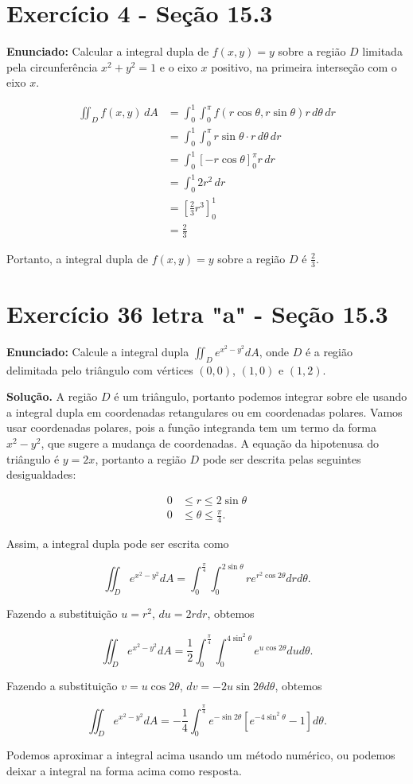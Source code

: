 \documentclass{article}
\begin{document}
\section*{Exercício 4 - Seção 15.3}

\textbf{Enunciado:} Calcular a integral dupla de $f(x,y) = y$ sobre a região $D$ limitada pela circunferência $x^2 + y^2 = 1$ e o eixo $x$ positivo, na primeira interseção com o eixo $x$.

\begin{align*}
    \iint_D f(x,y)\,dA &= \int_0^1 \int_0^{\pi} f(r\cos \theta, r\sin \theta) r\,d\theta\,dr \\
    &= \int_0^1 \int_0^{\pi} r\sin \theta \cdot r\,d\theta\,dr \\
    &= \int_0^1 \left[-r\cos \theta \right]_0^{\pi} r\,dr \\
    &= \int_0^1 2r^2\,dr \\
    &= \left[\frac{2}{3} r^3 \right]_0^1 \\
    &= \frac{2}{3}
\end{align*}

Portanto, a integral dupla de $f(x,y) = y$ sobre a região $D$ é $\frac{2}{3}$.

\newpage
\section*{Exercício 36 letra "a" - Seção 15.3}

\textbf{Enunciado:} Calcule a integral dupla $\iint_D e^{x^2 - y^2} dA$, onde $D$ é a região delimitada pelo triângulo com vértices $(0,0)$, $(1,0)$ e $(1,2)$.

\textbf{Solução.} A região $D$ é um triângulo, portanto podemos integrar sobre ele usando a integral dupla em coordenadas retangulares ou em coordenadas polares. Vamos usar coordenadas polares, pois a função integranda tem um termo da forma $x^2 - y^2$, que sugere a mudança de coordenadas. A equação da hipotenusa do triângulo é $y = 2x$, portanto a região $D$ pode ser descrita pelas seguintes desigualdades:

$$
\begin{aligned}
0 &\leq r \leq 2 \sin\theta \\
0 &\leq \theta \leq \frac{\pi}{4}.
\end{aligned}
$$

Assim, a integral dupla pode ser escrita como

$$
\iint_D e^{x^2 - y^2} dA = \int_0^{\frac{\pi}{4}} \int_0^{2\sin\theta} r e^{r^2 \cos 2\theta} dr d\theta.
$$

Fazendo a substituição $u = r^2$, $du = 2r dr$, obtemos

$$
\iint_D e^{x^2 - y^2} dA = \frac{1}{2} \int_0^{\frac{\pi}{4}} \int_0^{4\sin^2\theta} e^{u \cos 2\theta} du d\theta.
$$

Fazendo a substituição $v = u \cos 2\theta$, $dv = -2u \sin 2\theta d\theta$, obtemos

$$
\iint_D e^{x^2 - y^2} dA = -\frac{1}{4} \int_0^{\frac{\pi}{4}} e^{-\sin 2\theta} \left[ e^{-4 \sin^2 \theta} - 1 \right] d\theta.
$$

Podemos aproximar a integral acima usando um método numérico, ou podemos deixar a integral na forma acima como resposta. 
\end{document}
